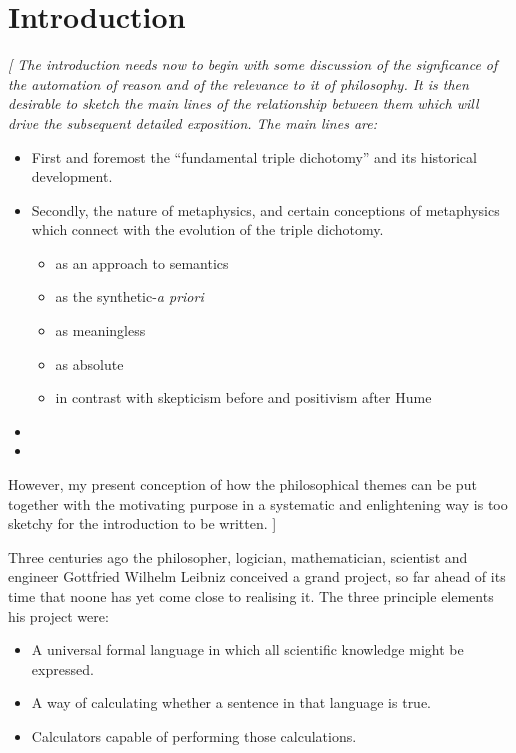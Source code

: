\def\rbjidintro{$$Id: intro.tex,v 1.8 2011/11/04 16:38:42 rbj Exp $$}
\chapter{Introduction}\label{Introduction}

{\it
[
The introduction needs now to begin with some discussion of the signficance of the automation of reason and of the relevance to it of philosophy.
It is then desirable to sketch the main lines of the relationship between them which will drive the subsequent detailed exposition.
The main lines are:
\begin{itemize}
\item First and foremost the ``fundamental triple dichotomy'' and its historical development.
\item Secondly, the nature of metaphysics, and certain conceptions of metaphysics which connect with the evolution of the triple dichotomy.
\begin{itemize}
\item as an approach to semantics
\item as the synthetic-\emph{a priori}
\item as meaningless
\item as absolute
\item in contrast with skepticism before and positivism after Hume
\end{itemize}
\item 
\item
\end{itemize}

However, my present conception of how the philosophical themes can be put together with the motivating purpose in a systematic and enlightening way is too sketchy for the introduction to be written.
]
}

Three centuries ago the philosopher, logician, mathematician, scientist and engineer Gottfried Wilhelm Leibniz conceived a grand project, so far ahead of its time that noone has yet come close to realising it.
The three principle elements his project were:
\begin{itemize}
\item A universal formal language in which all scientific knowledge might be expressed.
\item A way of calculating whether a sentence in that language is true.
\item Calculators capable of performing those calculations.
\end{itemize}

